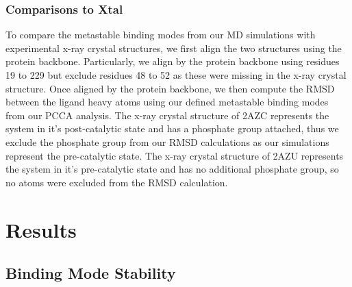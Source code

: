 \documentclass[fleqn,10pt]{wlscirep}
\begin{document}
\subsubsection{Comparisons to Xtal}
To compare the metastable binding modes from our MD simulations with experimental x-ray crystal structures, we first align the two structures using the protein backbone.
Particularly, we align by the protein backbone using residues 19 to 229 but exclude residues 48 to 52 as these were missing in the x-ray crystal structure.
Once aligned by the protein backbone, we then compute the RMSD between the ligand heavy atoms using our defined metastable binding modes from our PCCA analysis.
The x-ray crystal structure of 2AZC represents the system in it's post-catalytic state and has a phosphate group attached, thus we exclude the phosphate group from our RMSD calculations as our simulations represent the pre-catalytic state.
The x-ray crystal structure of 2AZU represents the system in it's pre-catalytic state and has no additional phosphate group, so no atoms were excluded from the RMSD calculation.


\section{Results}

\subsection{Binding Mode Stability}
\end{document}
